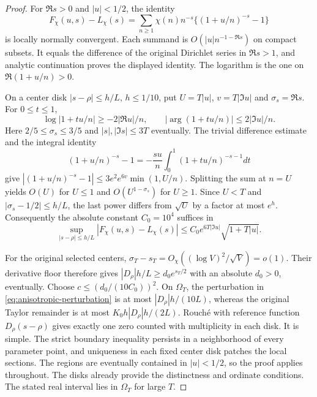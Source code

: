 \begin{proof}
For $\Re s>0$ and $|u|<1/2$, the identity
\begin{equation}\label{eq:shift-difference-series}
 F_\chi(u,s)-L_\chi(s)
 =\sum_{n\ge1}\chi(n)n^{-s}\{(1+u/n)^{-s}-1\}
\end{equation}
is locally normally convergent. Each summand is
$O(|u|n^{-1-\Re s})$ on compact subsets. It equals the difference
of the original Dirichlet series in $\Re s>1$, and analytic
continuation proves the displayed identity. The logarithm is the
one on $\Re(1+u/n)>0$.

On a center disk $|s-\rho|\le h/L$, $h\le1/10$, put
$U=T|u|$, $v=T|\Im u|$ and $\sigma_s=\Re s$.
For $0\le t\le1$,
\[
 \log|1+tu/n|\ge-2|\Re u|/n,\qquad
 |\arg(1+tu/n)|\le2|\Im u|/n.
\]
Here $2/5\le\sigma_s\le3/5$ and $|s|,|\Im s|\le3T$ eventually.
The trivial difference estimate and the integral identity
\[
 (1+u/n)^{-s}-1=-\frac{su}n
                         \int_0^1(1+tu/n)^{-s-1}dt
\]
give
$|(1+u/n)^{-s}-1|\le3e^2e^{6v}\min(1,U/n)$.
Splitting the sum at $n=U$ yields $O(U)$ for $U\le1$ and
$O(U^{1-\sigma_s})$ for $U\ge1$.
Since $U<T$ and $|\sigma_s-1/2|\le h/L$, the last power differs
from $\sqrt U$ by a factor at most $e^h$.
Consequently the absolute constant $C_0=10^4$ suffices in
\begin{equation}\label{eq:anisotropic-perturbation}
 \sup_{|s-\rho|\le h/L}|F_\chi(u,s)-L_\chi(s)|
                \le C_0 e^{6T|\Im u|}\sqrt{1+T|u|}.
\end{equation}

For the original selected centers,
$\sigma_T-s_T=O_\chi((\log V)^2/\sqrt V)=o(1)$.
Their derivative floor therefore gives
$|D_\rho|h/L\ge d_0e^{s_T/2}$ with an absolute $d_0>0$,
eventually. Choose $c\le(d_0/(10C_0))^2$.
On $\Omega_T$, the perturbation in
\eqref{eq:anisotropic-perturbation} is at most
$|D_\rho|h/(10L)$, whereas the original Taylor remainder is at most
$K_0h|D_\rho|h/(2L)$. Rouch\'e with reference function
$D_\rho(s-\rho)$ gives exactly one zero counted with multiplicity
in each disk. It is simple. The strict boundary inequality persists
in a neighborhood of every parameter point, and uniqueness in each
fixed center disk patches the local sections. The regions are
eventually contained in $|u|<1/2$, so the proof applies throughout.
The disks already provide the distinctness and ordinate conditions.
The stated real interval lies in $\Omega_T$ for large $T$.


\end{proof}
